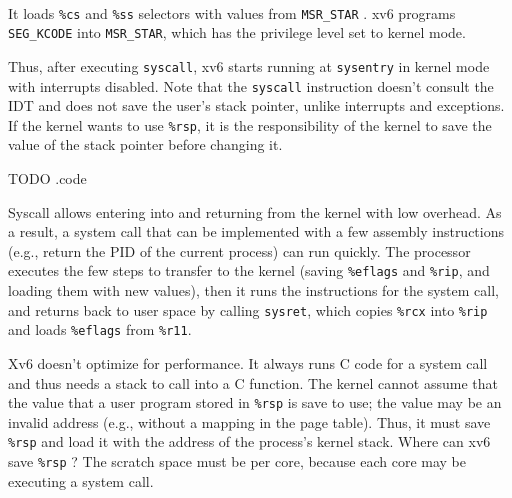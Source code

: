{\paragraph{\textbullet}It loads
\texttt{\%cs}
and
\texttt{\%ss}
selectors with values from
\lstinline{MSR_STAR}
.
xv6 programs
\lstinline{SEG_KCODE}
into
\lstinline{MSR_STAR},
which has the privilege level set to kernel mode.

Thus, after executing
\lstinline{syscall},
xv6 starts running at
\lstinline{sysentry}
in kernel mode with interrupts disabled.
Note that the
\lstinline{syscall}
instruction doesn't consult the IDT and does not save the user's stack pointer,
unlike interrupts and exceptions. If the kernel wants
to use
\texttt{\%rsp},
it is the responsibility of the kernel to
save the value of the stack pointer before changing it.

TODO .code

Syscall allows entering into and returning from the kernel with low overhead. As
a result, a system call that can be implemented with a few assembly instructions
(e.g., return the PID of the current process) can run quickly.  The processor
executes the few steps to transfer to the kernel (saving
\texttt{\%eflags}
and
\texttt{\%rip},
and loading them with new values), then it runs the instructions for the system
call, and returns back to user space by calling
\lstinline{sysret},
which copies
\texttt{\%rcx}
into
\texttt{\%rip}
and loads
\texttt{\%eflags}
from
\texttt{\%r11}.

Xv6 doesn't optimize for performance. It always runs C code for a system call
and thus needs a stack to call into a C function.  The kernel
cannot assume that the value that a user program stored in
\texttt{\%rsp}
is save to use; the value may be an invalid address (e.g., without a mapping
in the page table).  Thus, it must save
\texttt{\%rsp}
and load it with the address of the process's kernel stack.
Where can xv6 save
\texttt{\%rsp} ?
The scratch space must be per core, because each core may
be executing a system call.

}
